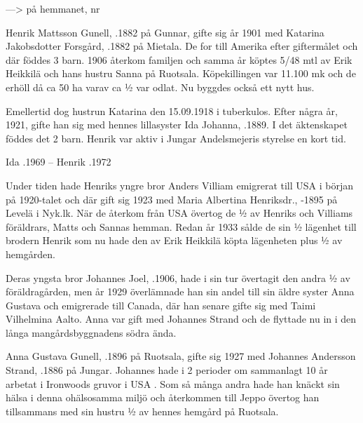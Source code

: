 --->  på hemmanet, nr 


Henrik Mattsson Gunell, .1882 på Gunnar, gifte sig år 1901 med Katarina Jakobsdotter Forsgård, .1882 på Mietala. De for till Amerika efter giftermålet och där föddes 3 barn. 1906 återkom familjen och samma år köptes 5/48 mtl av Erik Heikkilä och hans hustru Sanna på Ruotsala. Köpekillingen var 11.100 mk och de erhöll då ca 50 ha varav ca ½ var odlat. Nu byggdes också ett nytt hus.

Emellertid dog hustrun Katarina den 15.09.1918 i tuberkulos. Efter några år, 1921, gifte han sig med hennes lillasyster Ida Johanna, .1889. I det äktenskapet föddes det 2 barn. Henrik var aktiv i Jungar Andelsmejeris styrelse en kort tid.
\begin{jhchildren}
  \item {}
  \item {}
  \item {}
  \item {}
  \item {}
  \item {}
  \item {}
\end{jhchildren}
Ida .1969  --  Henrik .1972

Under tiden hade Henriks yngre bror Anders Villiam emigrerat till USA i början på 1920-talet och där gift sig 1923 med Maria Albertina Henriksdr., -1895 på Levelä i Nyk.lk. När de återkom från USA övertog de ½ av Henriks och Villiams föräldrars,  Matts och Sannas hemman. Redan år 1933 sålde de sin ½ lägenhet till brodern Henrik som nu hade
den av Erik Heikkilä köpta lägenheten plus ½ av hemgården.

Deras yngsta bror Johannes Joel, .1906, hade i sin tur övertagit den andra ½  av föräldragården, men år 1929  överlämnade han sin andel till sin äldre syster Anna Gustava och emigrerade till Canada, där han senare gifte sig med Taimi Vilhelmina Aalto. Anna var gift med Johannes Strand och de flyttade nu in i den långa mangårdsbyggnadens
södra ända.


Anna Gustava Gunell, .1896 på Ruotsala, gifte sig 1927 med Johannes Andersson Strand, .1886 på Jungar. Johannes hade i 2 perioder om sammanlagt 10 år arbetat i Ironwoods gruvor i USA . Som så många andra hade han knäckt sin hälsa i denna ohälsosamma miljö och återkommen till Jeppo övertog han tillsammans med sin hustru ½ av hennes hemgård på Ruotsala.

